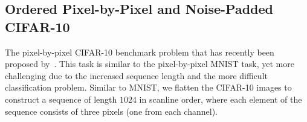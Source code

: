 \documentclass{article} \usepackage{iclr2021_conference,times}
\begin{document}
\begin{table}[!t]
	\caption{Sensitivity to random initialization evaluated over 10 runs.}
	\label{tab:minmax}
	\centering
\end{table}


\subsection{Ordered Pixel-by-Pixel and Noise-Padded CIFAR-10}\label{sec:cifar10}

The pixel-by-pixel CIFAR-10 benchmark problem that has recently been proposed by~\citep{chang2018antisymmetricrnn}. This task is similar to the pixel-by-pixel MNIST task, yet more challenging due to the increased sequence length and the more difficult classification problem.  
Similar to MNIST, we flatten the CIFAR-10 images to construct a sequence of length $1024$ in scanline order, where each element of the sequence consists of three pixels (one from each channel).
\end{document}
